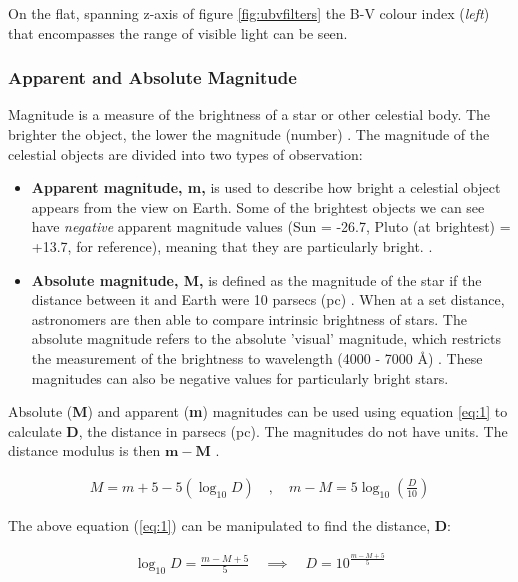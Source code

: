 \documentclass[12pt]{article}
\begin{document}
On the flat, spanning z-axis of figure \ref{fig:ubvfilters} the B-V colour index (\textit{left}) that encompasses the range of visible light can be seen.

\subsubsection{Apparent and Absolute Magnitude} \label{sec:1.1.3}

Magnitude is a measure of the brightness of a star or other celestial body. The brighter the object, the lower the magnitude (number)
\cite{britmag}.
The magnitude of the celestial objects are divided into two types of observation:

\begin{itemize}
    \item \textbf{Apparent magnitude, m,} is used to describe how bright a celestial object appears from the view on Earth. Some of the brightest objects we can see
    have \textit{negative} apparent magnitude values (Sun = -26.7, Pluto (at brightest) = +13.7, for reference), meaning that they are particularly bright.
    \cite{lcomag}.
    \item \textbf{Absolute magnitude, M,} is defined as the magnitude of the star if the distance between it and Earth were 10 parsecs (pc)
    \cite{lcoabsmag,cosmosabsmag}.
    When at a set distance, astronomers are then able to compare intrinsic brightness of stars. The absolute magnitude refers to the absolute 'visual' magnitude, which restricts
    the measurement of the brightness to wavelength (4000 - 7000 Å)
    \cite{cosmosabsmag}.
    These magnitudes can also be negative values for particularly bright stars.
\end{itemize}

Absolute (\textbf{M}) and apparent (\textbf{m}) magnitudes can be used using equation \ref{eq:1} to calculate \textbf{D}, the distance in parsecs (pc). The magnitudes do not have units.
The distance modulus is then $\mathbf{m - M}$
\cite{cosmosabsmag}.

\vspace{-1.5ex}
\begin{gather} \label{eq:1}
    M = m + 5 - 5 (\log_{10} D) \quad , \quad m - M = 5 \log_{10} \left( \frac{D}{10} \right)
\end{gather}

The above equation (\ref{eq:1}) can be manipulated to find the distance, \textbf{D}:

\vspace{-1.5ex}
\begin{gather} \label{eq:2}
    \log_{10}D = \frac{m - M + 5}{5} \quad \implies \quad D = 10^{\frac{m - M + 5}{5}}
\end{gather}
\end{document}
